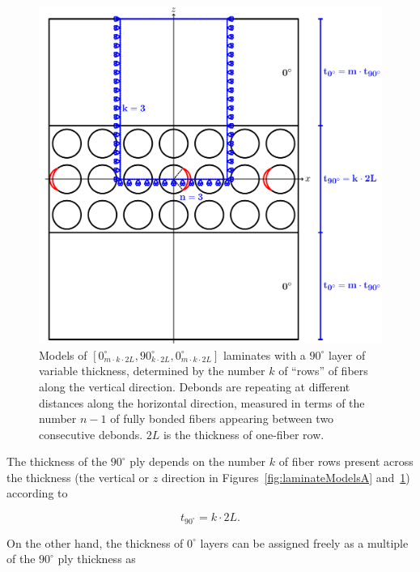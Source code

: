 \documentclass[Review,sagev,times]{sagej}
\begin{document}
\begin{figure}[!htb]
\centering
        \includegraphics[height=0.425\textheight]{ThickPly.pdf}
\caption{Models of $\left[0_{m\cdot k\cdot2L}^{\circ},90_{k\cdot2L}^{\circ},0_{m\cdot k\cdot2L}^{\circ}\right]$ laminates with a $90^{\circ}$ layer of variable thickness, determined by the number $k$ of ``rows'' of fibers along the vertical direction.  Debonds are repeating at different distances along the horizontal direction, measured in terms of the number $n-1$ of fully bonded fibers appearing between two consecutive debonds. $2L$ is the thickness of one-fiber row.}\label{fig:laminateModelsB}
\end{figure}

The thickness of the $90^{\circ}$ ply depends on the number $k$ of fiber rows present across the thickness (the vertical or $z$ direction in Figures~\ref{fig:laminateModelsA} and~\ref{fig:laminateModelsB}) according to

\begin{equation}\label{eq:t90}
t_{90^{\circ}}=k\cdot2L.
\end{equation}

On the other hand, the thickness of $0^{\circ}$ layers can be assigned freely as a multiple of the $90^{\circ}$ ply thickness as
\end{document}

